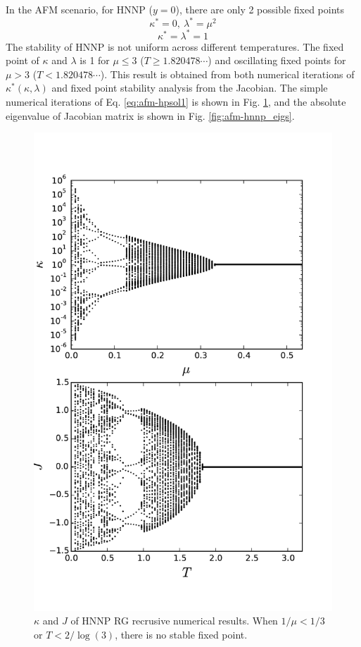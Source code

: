In the AFM scenario, for HNNP ($y = 0$), there are only 2 possible fixed points 
\begin{equation}
\kappa^* = 0, \ \lambda^* = \mu^2 
\end{equation} 
\begin{equation}
\kappa^* = \lambda^* = 1 
\end{equation} 
 The stability of HNNP is not uniform across different temperatures. The fixed point of $\kappa$ and $\lambda$ is 1 for $\mu \le 3$ ($T\ge1.820478\cdots$) and oscillating fixed points for $\mu > 3$ ($T<1.820478\cdots$). This result is obtained from both numerical iterations of $\kappa^*(\kappa, \lambda)$ and fixed point stability analysis from the Jacobian.
The simple numerical iterations of Eq. \ref{eq:afm-hpsol1} is shown in Fig. \ref{fig:afm-hnnpkappa}, and the absolute eigenvalue of Jacobian matrix is shown in Fig. \ref{fig:afm-hnnp_eigs}.
\begin{figure}
\centering \includegraphics[width=0.6\columnwidth]{Chapter-3/HNNP_RG_Kvsmu_JvsT.pdf}
\protect\caption{ $\kappa$ and $J$ of HNNP RG recrusive numerical results. When $1/\mu < 1/3$ or $T < 2/\log(3)$, there is no stable fixed point. }
\label{fig:afm-hnnpkappa} 
\end{figure}


